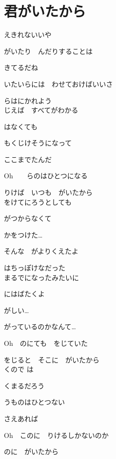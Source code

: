 \section{ 君がいたから}
\large{

えきれないいや

がいたり　んだりすることは

きてるだね

いたいらには　わせておけばいいさ

らはにかれよう
\\

じえば　すべてがわかる

はなくても

もくじけそうになって

ここまでたんだ

Oh　　らのはひとつになる

りけば　いつも　がいたから
\\

をけてにろうとしても

がつからなくて

かをつけた…

そんな　がよりくえたよ

はちっぽけなだった
\\

まるでになったみたいに

にはばたくよ

がしい…

がっているのかなんて…

Oh　のにても　をじていた

をじると　そこに　がいたから
\\

くので は

くまるだろう

うものはひとつない

さえあれば

Oh　このに　りけるしかないのか

のに　がいたから

}